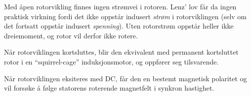 \vskip 10pt

Med åpen rotorvikling finnes ingen strømvei i rotoren. Lenz' lov får da ingen praktisk virkning fordi det ikke oppstår indusert {\it strøm} i rotorviklingen (selv om det fortsatt oppstår indusert {\it spenning}). Uten rotorstrøm oppstår heller ikke dreiemoment, og rotor vil derfor ikke rotere.

\vskip 10pt

Når rotorviklingen kortsluttes, blir den ekvivalent med permanent kortsluttet rotor i en ``squirrel-cage'' induksjonsmotor, og oppfører seg tilsvarende.

\vskip 10pt

Når rotorviklingen eksiteres med DC, får den en bestemt magnetisk polaritet og vil forsøke å følge statorens roterende magnetfelt i synkron hastighet.











